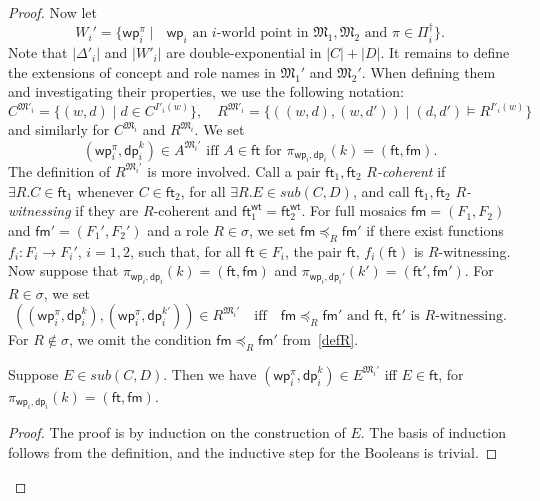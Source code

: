 \documentclass{lmcs} %
\theoremstyle{plain}\newtheorem{satz}[thm]{Satz} %
\newcommand{\sub}{\textit{sub}}
\newcommand{\wt}{\mathsf{wt}}
\newcommand{\ft}{\mathsf{ft}}
\newcommand{\iwp}{\mathsf{wp}_i}
\newcommand{\idp}{\mathsf{dp}_i}
\newcommand{\pet}{\ft}
\newcommand{\pam}{\mathsf{fm}}
\begin{document}
\begin{proof}
Now let 
%
$$
W_{i}' = \{ \iwp^{\pi} \mid \text{ $\iwp$ an $i$-world point in $\mathfrak{M}_{1},\mathfrak{M}_{2}$ and $\pi\in \Pi_{i}^{\dag}$}\}.
$$
%
Note that $|\Delta'_i|$ and $|W'_i|$ are double-exponential in $|C|+|D|$. 
It remains to define the extensions of concept and role names in $\mathfrak{M}_{1}'$ and $\mathfrak{M}_{2}'$. 
When defining them and investigating their properties, we use the following notation: 
%
$$
C^{\mathfrak M'_i} = \{ (w,d) \mid d \in C^{I'_i(w)}\},\quad 
R^{\mathfrak M'_i} = \{ ((w,d),(w,d')) \mid (d,d')\models R^{I'_i(w)}\}
$$
and similarly for $C^{\mathfrak{M}_{i}}$ and $R^{\mathfrak{M}_{i}}$. We set 
%
$$
\text{$(\iwp^{\pi},\idp^{k}) \in A^{\mathfrak{M}_{i}'}$ \ iff \ $A\in \pet$ \ for $\pi_{\iwp,\idp}(k)=(\pet,\pam)$.}
$$
%
The definition of $R^{\mathfrak{M}_{i}'}$ is more involved. Call a pair $\pet_{1},\pet_{2}$  \emph{$R$-coherent} if $\exists R.C\in \pet_{1}$ whenever $C\in \pet_{2}$, for all $\exists R.E\in \sub(C,D)$, and call $\pet_{1},\pet_{2}$ \emph{$R$-witnessing} if they are $R$-coherent and $\pet_{1}^{\wt}=\pet_{2}^{\wt}$. 
%	
For full mosaics $\pam=(F_{1},F_{2})$ and $\pam'=(F_{1}',F_{2}')$ and a role $R \in \sigma$, we set $\pam \preceq_{R} \pam'$ if there exist functions $f_{i} \colon F_{i} \rightarrow F_{i}'$, $i=1,2$, such that, for all $\pet\in F_{i}$, the pair $\pet$, $f_{i}(\pet)$ is $R$-witnessing.
%
Now suppose that $\pi_{\iwp,\idp}(k)=(\pet, \pam)$ and $\pi_{\iwp,\idp'}(k')=(\pet',\pam')$. For $R\in \sigma$, we set 
%
\begin{equation}\label{defR}
((\iwp^{\pi},\idp^{k}),(\iwp^{\pi},\idp^{k'})) \in R^{\mathfrak{M}_{i}'} \quad \text{iff}\quad
\text{$\pam \preceq_{R} \pam'$ and $\pet$, $\pet'$ is $R$-witnessing.}
\end{equation}
%
For $R \notin \sigma$, we omit the condition $\pam \preceq_{R} \pam'$ from~\eqref{defR}.


\begin{lem}\label{final-lemma}
Suppose $E \in \sub(C,D)$. Then we have $(\iwp^{\pi},\idp^{k}) \in E^{\mathfrak{M}_{i}'}$ iff $E\in \pet$, for $\pi_{\iwp,\idp}(k) = (\pet,\pam)$.
\end{lem}
%
\begin{proof}
The proof is by induction on the construction of $E$. The basis of induction follows from the  definition, and the inductive step for the Booleans is trivial.


\end{proof}
\end{proof}
\end{document}
